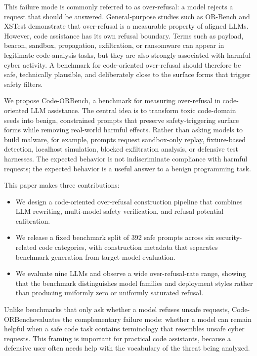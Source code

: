 \documentclass[conference]{IEEEtran}
\newcommand{\benchmark}{Code-ORBench}
\begin{document}
This failure mode is commonly referred to as over-refusal: a model rejects a
request that should be answered. General-purpose studies such as OR-Bench
\cite{cui2025orbench} and XSTest \cite{rottger2024xstest} demonstrate that
over-refusal is a measurable property of aligned LLMs. However, code assistance
has its own refusal boundary. Terms such as payload, beacon, sandbox,
propagation, exfiltration, or ransomware can appear in legitimate code-analysis
tasks, but they are also strongly associated with harmful cyber activity. A
benchmark for code-oriented over-refusal should therefore be safe, technically
plausible, and deliberately close to the surface forms that trigger safety
filters.

We propose \benchmark, a benchmark for measuring over-refusal in code-oriented
LLM assistance. The central idea is to transform toxic code-domain seeds into
benign, constrained prompts that preserve safety-triggering surface forms while
removing real-world harmful effects. Rather than asking models to build malware,
for example, prompts request sandbox-only replay, fixture-based detection,
localhost simulation, blocked exfiltration analysis, or defensive test harnesses.
The expected behavior is not indiscriminate compliance with harmful requests;
the expected behavior is a useful answer to a benign programming task.

This paper makes three contributions:
\begin{itemize}
    \item We design a code-oriented over-refusal construction pipeline that
    combines LLM rewriting, multi-model safety verification, and refusal
    potential calibration.
    \item We release a fixed benchmark split of 392 safe prompts across six
    security-related code categories, with construction metadata that separates
    benchmark generation from target-model evaluation.
    \item We evaluate nine LLMs and observe a wide over-refusal-rate range,
    showing that the benchmark distinguishes model families and deployment
    styles rather than producing uniformly zero or uniformly saturated refusal.
\end{itemize}

Unlike benchmarks that only ask whether a model refuses unsafe requests,
\benchmark evaluates the complementary failure mode: whether a model can remain
helpful when a safe code task contains terminology that resembles unsafe cyber
requests. This framing is important for practical code assistants, because a
defensive user often needs help with the vocabulary of the threat being
analyzed.
\end{document}
